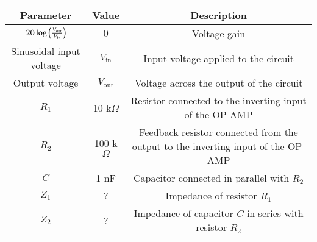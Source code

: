 
\begin{tabular}{|c|c|c|}
\hline
\textbf{Parameter} &  \textbf{Value} & \textbf{Description} \\
\hline
 $20 \log \left(\frac{V_{\text{out}}}{V_{\text{in}}}\right)$ & $0$ &Voltage gain\\
\hline
 Sinusoidal input voltage & $V_{\text{in}}$ & Input voltage applied to the circuit \\
\hline
 Output voltage & $V_{\text{out}}$ & Voltage across the output of the circuit \\
\hline
$R_1$ & 10 k$\Omega$ & Resistor connected to the inverting input of the OP-AMP \\
\hline
$R_2$ & 100 k$\Omega$ & Feedback resistor connected from the output to the inverting input of the OP-AMP \\
\hline
$C$ & 1 nF & Capacitor connected in parallel with $R_2$ \\
 \hline
 $Z_1$ &  ? & Impedance of resistor $R_1$ \\
 \hline
$Z_2$ & ? & Impedance of capacitor $C$ in series with resistor $R_2$ \\
\hline
\end{tabular}


